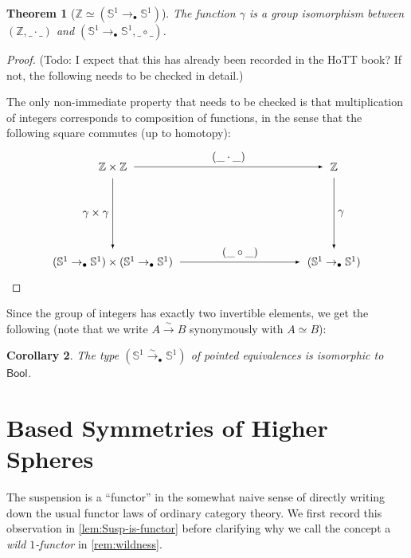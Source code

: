 \documentclass[11pt,a4paper,oneside,reqno]{amsart}
\newtheorem{theorem}{Theorem}
\newtheorem{corollary}[theorem]{Corollary}
\theoremstyle{definition}
\theoremstyle{remark}
\newcommand{\Z}{\mathbb Z}
\newcommand{\sph}[1]{{\mathbb S}^{#1}}
\newcommand{\pointedm}{\rightarrow_\bullet}
\begin{document}
\begin{theorem}[$\Z \simeq (\sph 1 \pointedm \sph 1)$]
 The function $\gamma$ is a group isomorphism between $(\Z, \_ \cdot \_)$ and $(\sph 1 \pointedm \sph 1, \_ \circ \_)$.
\end{theorem}
\begin{proof}
(Todo: I expect that this has already been recorded in the HoTT book?
If not, the following needs to be checked in detail.)

The only non-immediate property that needs to be checked is that multiplication of integers corresponds to composition of functions, in the sense that 
the following square commutes (up to homotopy):
\begin{equation}
\begin{tikzpicture}[x=7cm,y=-3cm,baseline=(current bounding box.center)]
 \tikzset{arrow/.style={shorten >=0.1cm,shorten <=.1cm,-latex}}
 \node (A) at (0,0) {$\Z \times \Z$}; 
 \node (B) at (0,1) {$(\sph 1 \pointedm \sph 1) \times (\sph 1 \pointedm \sph 1)$}; 
 \node (C) at (1,1) {$(\sph 1 \pointedm \sph 1)$}; 
 \node (D) at (1,0) {$\Z$}; 

 \draw[arrow] (A) to node [left] {$\gamma \times \gamma$} (B);
 \draw[arrow] (B) to node [above] {$(\_ \circ \_)$} (C);
 \draw[arrow] (D) to node [right] {$\gamma$} (C);
 \draw[arrow] (A) to node [above] {$(\_ \cdot \_)$} (D);
\end{tikzpicture}
\end{equation}
\end{proof}

Since the group of integers has exactly two invertible elements, we get the following
(note that we write $A \xrightarrow{\sim} B$ synonymously with $A \simeq B$):

\begin{corollary} \label{cor:sph1-bool}
 The type $(\sph 1 \xrightarrow{\sim}_\bullet \sph 1)$ of pointed equivalences
 is isomorphic to $\mathsf{Bool}$.
\end{corollary}

\section{Based Symmetries of Higher Spheres}

The suspension is a ``functor'' in the somewhat naive sense of directly writing down the usual functor laws of ordinary category theory.
We first record this observation in \cref{lem:Susp-is-functor}
before clarifying why we call the concept a \emph{wild $1$-functor} in \cref{rem:wildness}.
\end{document}
